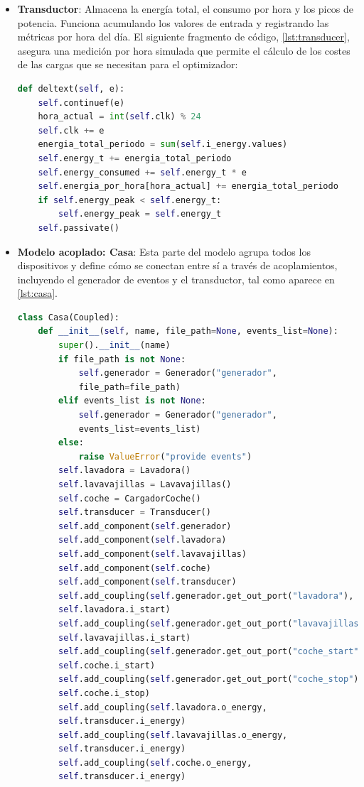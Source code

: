 \documentclass[11pt,a4paper]{book}
\begin{document}
\begin{itemize}
    \item \textbf{Transductor}: Almacena la energía total, el consumo por hora y los picos de potencia. Funciona acumulando los valores de entrada y registrando las métricas por hora del día. El siguiente fragmento de código, \autoref{lst:transducer},  asegura una medición por hora simulada que permite el cálculo de los costes de las cargas que se necesitan para el optimizador:
    \begin{lstlisting}[language=Python, caption={Método \texttt{deltext} del \texttt{Transducer}}, label={lst:transducer}]
    def deltext(self, e):
    self.continuef(e)
    hora_actual = int(self.clk) % 24  
    self.clk += e
    energia_total_periodo = sum(self.i_energy.values)
    self.energy_t += energia_total_periodo  
    self.energy_consumed += self.energy_t * e
    self.energia_por_hora[hora_actual] += energia_total_periodo
    if self.energy_peak < self.energy_t:
        self.energy_peak = self.energy_t
    self.passivate()
    \end{lstlisting}

    \item \textbf{Modelo acoplado: Casa}: Esta parte del modelo agrupa todos los dispositivos y define cómo se conectan entre sí a través de acoplamientos, incluyendo el generador de eventos y el transductor, tal como aparece en \autoref{lst:casa}.
    \begin{lstlisting}[language=Python, caption={Modelo acoplado \texttt{Casa}}, label={lst:casa}]
class Casa(Coupled):
    def __init__(self, name, file_path=None, events_list=None):
        super().__init__(name)
        if file_path is not None:
            self.generador = Generador("generador", 
            file_path=file_path)
        elif events_list is not None:
            self.generador = Generador("generador", 
            events_list=events_list)
        else:
            raise ValueError("provide events")
        self.lavadora = Lavadora()
        self.lavavajillas = Lavavajillas()
        self.coche = CargadorCoche()
        self.transducer = Transducer()
        self.add_component(self.generador)
        self.add_component(self.lavadora)
        self.add_component(self.lavavajillas)
        self.add_component(self.coche)
        self.add_component(self.transducer)
        self.add_coupling(self.generador.get_out_port("lavadora"), 
        self.lavadora.i_start)
        self.add_coupling(self.generador.get_out_port("lavavajillas"), 
        self.lavavajillas.i_start)
        self.add_coupling(self.generador.get_out_port("coche_start"), 
        self.coche.i_start)
        self.add_coupling(self.generador.get_out_port("coche_stop"), 
        self.coche.i_stop)
        self.add_coupling(self.lavadora.o_energy, 
        self.transducer.i_energy)
        self.add_coupling(self.lavavajillas.o_energy, 
        self.transducer.i_energy)
        self.add_coupling(self.coche.o_energy, 
        self.transducer.i_energy)
\end{lstlisting}
\end{itemize}
\end{document}
